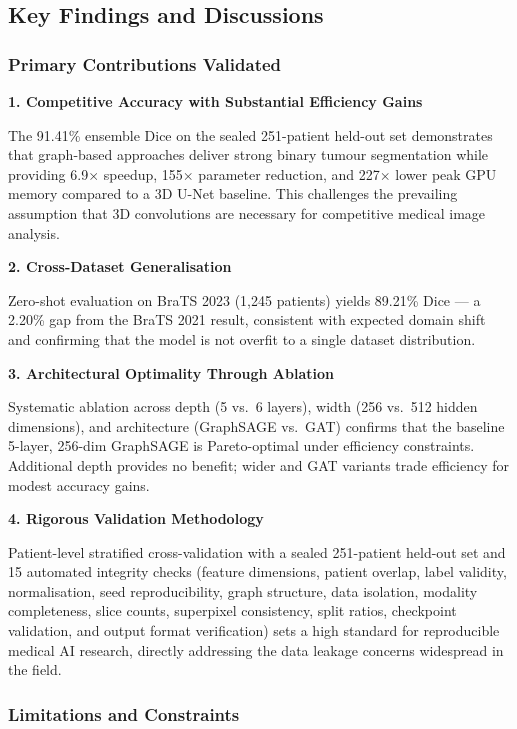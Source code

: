 \subsection{Key Findings and Discussions}

\subsubsection{Primary Contributions Validated}

\textbf{1. Competitive Accuracy with Substantial Efficiency Gains}

The 91.41\% ensemble Dice on the sealed 251-patient held-out set demonstrates that graph-based approaches deliver strong binary tumour segmentation while providing 6.9$\times$ speedup, 155$\times$ parameter reduction, and 227$\times$ lower peak GPU memory compared to a 3D U-Net baseline. This challenges the prevailing assumption that 3D convolutions are necessary for competitive medical image analysis.

\textbf{2. Cross-Dataset Generalisation}

Zero-shot evaluation on BraTS 2023 (1,245 patients) yields 89.21\% Dice — a 2.20\% gap from the BraTS 2021 result, consistent with expected domain shift and confirming that the model is not overfit to a single dataset distribution.

\textbf{3. Architectural Optimality Through Ablation}

Systematic ablation across depth (5 vs.\ 6 layers), width (256 vs.\ 512 hidden dimensions), and architecture (GraphSAGE vs.\ GAT) confirms that the baseline 5-layer, 256-dim GraphSAGE is Pareto-optimal under efficiency constraints. Additional depth provides no benefit; wider and GAT variants trade efficiency for modest accuracy gains.

\textbf{4. Rigorous Validation Methodology}

Patient-level stratified cross-validation with a sealed 251-patient held-out set and 15 automated integrity checks (feature dimensions, patient overlap, label validity, normalisation, seed reproducibility, graph structure, data isolation, modality completeness, slice counts, superpixel consistency, split ratios, checkpoint validation, and output format verification) sets a high standard for reproducible medical AI research, directly addressing the data leakage concerns widespread in the field.

\subsubsection{Limitations and Constraints}

